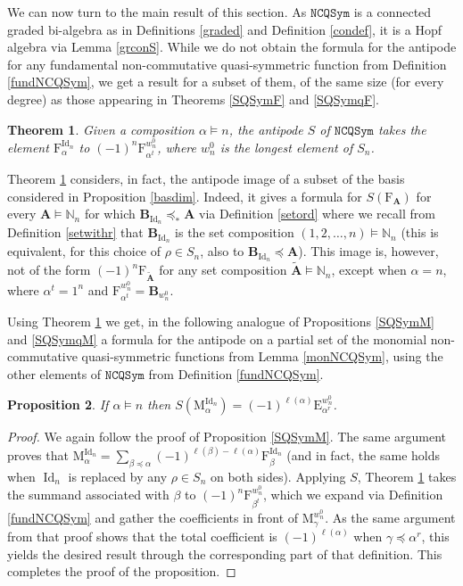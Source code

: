 \documentclass{article}
\newtheorem{thm}{Theorem}[section]
\newtheorem{prop}[thm]{Proposition}
\theoremstyle{definition}
\begin{document}
We can now turn to the main result of this section. As $\mathtt{NCQSym}$ is a connected graded bi-algebra as in Definitions \ref{graded} and Definition \ref{condef}, it is a Hopf algebra via Lemma \ref{grconS}. While we do not obtain the formula for the antipode for any fundamental non-commutative quasi-symmetric function from Definition \ref{fundNCQSym}, we get a result for a subset of them, of the same size (for every degree) as those appearing in Theorems \ref{SQSymF} and \ref{SQSymqF}.
\begin{thm}
Given a composition $\alpha \vDash n$, the antipode $S$ of $\mathtt{NCQSym}$ takes the element $\mathrm{F}_{\alpha}^{\operatorname{Id}_{n}}$ to $(-1)^{n}\mathrm{F}_{\alpha^{t}}^{w^{0}_{n}}$, where $w^{0}_{n}$ is the longest element of $S_{n}$. \label{SNCQSymF}
\end{thm}
Theorem \ref{SNCQSymF} considers, in fact, the antipode image of a subset of the basis considered in Proposition \ref{basdim}. Indeed, it gives a formula for $S(\mathrm{F}_{\mathbf{A}})$ for every $\mathbf{A}\vDash\mathbb{N}_{n}$ for which $\mathbf{B}_{\operatorname{Id}_{n}}\preceq_{*}\mathbf{A}$ via Definition \ref{setord} where we recall from Definition \ref{setwithr} that $\mathbf{B}_{\operatorname{Id}_{n}}$ is the set composition $(1,2,\ldots,n)\vDash\mathbb{N}_{n}$ (this is equivalent, for this choice of $\rho \in S_{n}$, also to $\mathbf{B}_{\operatorname{Id}_{n}}\preceq\mathbf{A}$). This image is, however, not of the form $(-1)^{n}\mathrm{F}_{\tilde{\mathbf{A}}}$ for any set composition $\tilde{\mathbf{A}}\vDash\mathbb{N}_{n}$, except when $\alpha=n$, where $\alpha^{t}=1^{n}$ and $\mathrm{F}_{\alpha^{t}}^{w^{0}_{n}}=\mathbf{B}_{w^{0}_{n}}$.

Using Theorem \ref{SNCQSymF} we get, in the following analogue of Propositions \ref{SQSymM} and \ref{SQSymqM} a formula for the antipode on a partial set of the monomial non-commutative quasi-symmetric functions from Lemma \ref{monNCQSym}, using the other elements of $\mathtt{NCQSym}$ from Definition \ref{fundNCQSym}.
\begin{prop}
If $\alpha \vDash n$ then $S(\mathrm{M}_{\alpha}^{\operatorname{Id}_{n}})=(-1)^{\ell(\alpha)}\mathrm{E}_{\alpha^{r}}^{w^{0}_{n}}$. \label{SNCQSymM}
\end{prop}

\begin{proof}
We again follow the proof of Proposition \ref{SQSymM}. The same argument proves that $\mathrm{M}_{\alpha}^{\operatorname{Id}_{n}}=\sum_{\beta\preceq\alpha}(-1)^{\ell(\beta)-\ell(\alpha)}\mathrm{F}_{\beta}^{\operatorname{Id}_{n}}$ (and in fact, the same holds when $\operatorname{Id}_{n}$ is replaced by any $\rho \in S_{n}$ on both sides). Applying $S$, Theorem \ref{SNCQSymF} takes the summand associated with $\beta$ to $(-1)^{n}\mathrm{F}_{\beta^{t}}^{w^{0}_{n}}$, which we expand via Definition \ref{fundNCQSym} and gather the coefficients in front of $\mathrm{M}_{\gamma}^{w^{0}_{n}}$. As the same argument from that proof shows that the total coefficient is $(-1)^{\ell(\alpha)}$ when $\gamma\preceq\alpha^{r}$, this yields the desired result through the corresponding part of that definition. This completes the proof of the proposition.
\end{proof}
\end{document}
